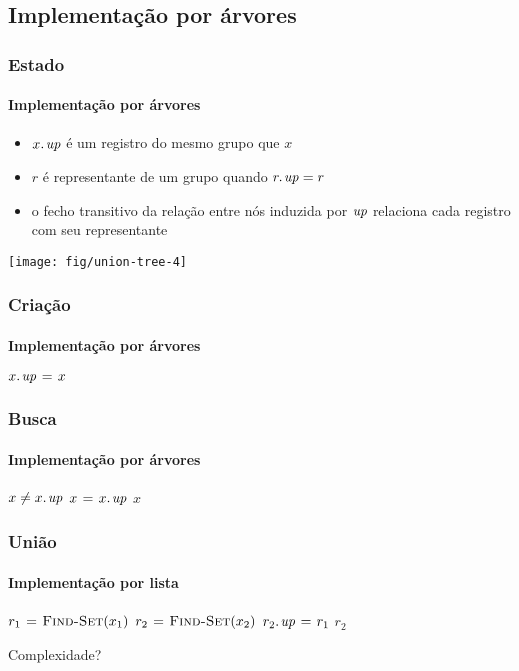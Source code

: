 \documentclass{beamer}
\begin{document}
\subsection{Implementação por árvores}

\begin{frame}
\frametitle{Estado}
\framesubtitle{Implementação por árvores}

\begin{itemize}
\item $\attrib{x}{up}$ é um registro do mesmo grupo que $x$
\item $r$ é representante de um grupo quando $\attrib{r}{up} = r$
\item o fecho transitivo da relação entre nós induzida por $\id{up}$ 
 relaciona cada registro com seu representante
\end{itemize}
\pause
\begin{center}
\texttt{[image: fig/union-tree-4]}
\end{center}

\end{frame}

\begin{frame}
\frametitle{Criação}
\framesubtitle{Implementação por árvores}

\begin{codebox}
\li $\attrib{x}{up} \gets x$
\end{codebox}

\end{frame}

\begin{frame}
\frametitle{Busca}
\framesubtitle{Implementação por árvores}

\begin{codebox}
\li \While $x \neq \attrib{x}{up}$
\li \Do $x \gets \attrib{x}{up}$
    \End
\li \Return $x$
\end{codebox}

\end{frame}

\begin{frame}
\frametitle{União}
\framesubtitle{Implementação por lista}

\begin{codebox}
\li $r_1 \mathrel{\hspace{1pt}=\hspace{1pt}} \textnormal{\scshape Find-Set}(x_1)$
\li $r_2 \mathrel{\hspace{1pt}=\hspace{1pt}} \textnormal{\scshape Find-Set}(x_2)$
\li $\attrib{r_2}{up} \gets r_1$
\li \Return $r_2$
\end{codebox}
\pause
\alert{Complexidade?}
\end{frame}
\end{document}
